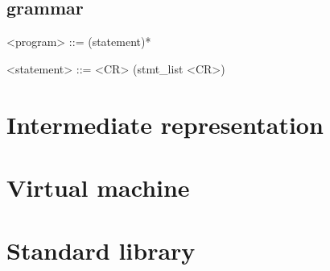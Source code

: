 \documentclass[10pt,a4paper]{article}
\begin{document}
\subsection{grammar}

\setlength{\grammarparsep}{10pt plus 1pt minus 1pt} %
\setlength{\grammarindent}{12em} %
\begin{grammar}


<program> ::= (statement)*

<statement> ::= <CR> 
\alt (stmt_list <CR>)


\end{grammar}

\section{Intermediate representation}

\section{Virtual machine}

\section{Standard library}
\end{document}
